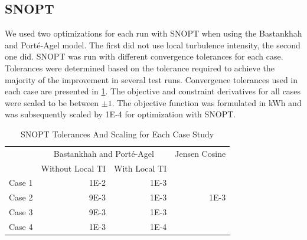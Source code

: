 \documentclass{jpconf}
\begin{document}
\subsection{SNOPT}
We used two optimizations for each run with SNOPT when using the Bastankhah and Port\'{e}-Agel model. The first did not use local turbulence intensity, the second one did. SNOPT was run with different convergence tolerances for each case. Tolerances were determined based on the tolerance required to achieve the majority of the improvement in several test runs. Convergence tolerances used in each case are presented in \cref{tab:snopttols}. The objective and constraint derivatives for all cases were scaled to be between $\pm1$. The objective function was formulated in kWh and was subsequently scaled by 1E-4 for optimization with SNOPT.
%
\begin{table}[h!]
	\centering
	\caption{SNOPT Tolerances And Scaling for Each Case Study}
	\label{tab:snopttols}
	\begin{tabular}{lrrr}
		\toprule
		{} & \multicolumn{2}{c}{Bastankhah and Port\'{e}-Agel} & Jensen Cosine \\
		\cmidrule(lr){2-3} \cmidrule(lr){4-4}
		 & Without Local TI & With Local TI &  \\
		\cmidrule(lr){2-3} 
		Case 1 &  1E-2 & 1E-3 & \\
		Case 2 & 9E-3 & 1E-3 & 1E-3 \\
		Case 3 & 9E-3 & 1E-3 & \\
		Case 4 &  1E-3 & 1E-4 &  \\
		\bottomrule
	\end{tabular}
\end{table}
\end{document}
